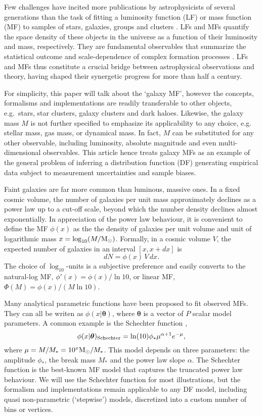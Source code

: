 \documentclass[a4paper,fleqn,usenatbib]{mnras}
\newcommand{\be}{\begin{equation}}
\newcommand{\ee}{\end{equation}}
\newcommand{\msun}{{\rm M}_{\odot}}
\newcommand{\eg}{e.g.\xspace}
\newcommand{\para}{{\bm{\theta}}}
\begin{document}
Few challenges have incited more publications by astrophysicists of several generations than the task of fitting a luminosity function (LF) or mass function (MF) to samples of stars, galaxies, groups and clusters \citep[\eg][]{Schmidt1968,Lynden-Bell1971,Turner1979,Sandage1979,Kirshner1979,Davis1982,Efstathiou1988,Zwaan2003,Teerikorpi2004,Cole2011,Loveday2015,Weigel2016}. LFs and MFs quantify the space density of these objects in the universe as a function of their luminosity and mass, respectively. They are fundamental observables that summarize the statistical outcome and scale-dependence of complex formation processes \citep[\eg][]{Croton2006,Murray2013}. LFs and MFs thus constitute a crucial bridge between astrophysical observations and theory, having shaped their synergetic progress for more than half a century.

For simplicity, this paper will talk about the `galaxy MF', however the concepts, formalisms and implementations are readily transferable to other objects, e.g.~stars, star clusters, galaxy clusters and dark haloes. Likewise, the galaxy mass $M$ is not further specified to emphasize its applicability to any choice, \eg stellar mass, gas mass, or dynamical mass. In fact, $M$ can be substituted for any other observable, including luminosity, absolute magnitude and even multi-dimensional observables. This article hence treats galaxy MFs as an example of the general problem of inferring a distribution function (DF) generating empirical data subject to measurement uncertainties and sample biases.

Faint galaxies are far more common than luminous, massive ones. In a fixed cosmic volume, the number of galaxies per unit mass approximately declines as a power law up to a cut-off scale, beyond which the number density declines almost exponentially. In appreciation of the power law behaviour, it is convenient to define the MF $\phi(x)$ as the the density of galaxies per unit volume and unit of logarithmic mass $x=\log_{10}(M/\msun)$. Formally, in a cosmic volume $V$, the expected number of galaxies in an interval $[x,x+dx]$ is
%
\be\label{eq:mf}
	dN = \phi(x)\,V\,dx.
\ee
%
The choice of $\log_{10}$-units is a subjective preference and easily converts to the natural-log MF, $\phi'(x)=\phi(x)/\ln10$, or linear MF, $\Phi(M)=\phi(x)/(M\ln10)$.

Many analytical parametric functions have been proposed to fit observed MFs. They can all be writen as $\phi(x|\para)$, where $\para$ is a vector of $P$ scalar model parameters. A common example is the Schechter function \citep{Schechter1976},
\be\label{eq:Schechter}
	\phi(x|\para)_{\rm Schechter} = \ln(10)\phi_\ast\mu^{\alpha+1}e^{-\mu},
\ee
%
where $\mu= M/M_\ast=10^x\msun/M_\ast$. This model depends on three parameters: the amplitude $\phi_\ast$, the break mass $M_\ast$ and the power law slope $\alpha$. The Schechter function is the best-known MF model that captures the truncated power law behaviour. We will use the Schechter function for most illustrations, but the formalism and implementations remain applicable to any DF model, including quasi non-parametric (`stepwise') models, discretized into a custom number of bins or vertices.
\end{document}
